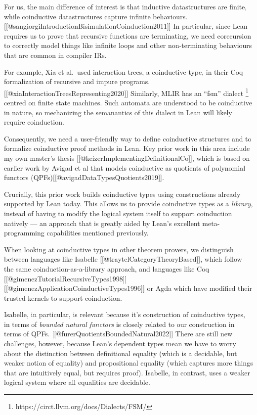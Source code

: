 \documentclass[a4paper]{article}
\begin{document}
For us, the main difference of interest is that inductive datastructures
are finite, while coinductive datastructures capture infinite
behaviours.
{[}{[}@sangiorgiIntroductionBisimulationCoinduction2011{]}{]} In
particular, since Lean requires us to prove that recursive functions are
terminating, we need corecursion to correctly model things like infinite
loops and other non-terminating behaviours that are common in compiler
IRs.

For example, Xia et al.~used interaction trees, a coinductive type, in
their Coq formalization of recursive and impure programs.
{[}{[}@xiaInteractionTreesRepresenting2020{]}{]} Similarly, MLIR has an
``fsm'' dialect \footnote{https://circt.llvm.org/docs/Dialects/FSM/}
centred on finite state machines. Such automata are understood to be
coinductive in nature, so mechanizing the semanantics of this dialect in
Lean will likely require coinduction.

Consequently, we need a user-friendly way to define coinductive
structures and to formalize coinductive proof methods in Lean. Key prior
work in this area include my own master's thesis
{[}{[}@keizerImplementingDefinitionalCo{]}{]}, which is based on earlier
work by Avigad et al that models coinductive as quotients of polynomial
functors (QPFs){[}{[}@avigadDataTypesQuotients2019{]}{]}.

Crucially, this prior work builds coinductive types using constructions
already supported by Lean today. This allows us to provide coinductive
types as a \emph{library}, instead of having to modify the logical
system itself to support coinduction natively --- an approach that is
greatly aided by Lean's excellent meta-programming capabilities
mentioned previously.

When looking at coinductive types in other theorem provers, we
distinguish between languages like Isabelle
{[}{[}@traytelCategoryTheoryBased{]}{]}, which follow the same
coinduction-as-a-library approach, and languages like Coq
{[}{[}@gimenezTutorialRecursiveTypes1998{]}{]}{[}{[}@gimenezApplicationCoinductiveTypes1996{]}{]}
or Agda which have modified their trusted kernels to support
coinduction.

Isabelle, in particular, is relevant because it's construction of
coinductive types, in terms of \emph{bounded natural functors} is
closely related to our construction in terms of QPFs.
{[}{[}@furerQuotientsBoundedNatural2022{]}{]} There are still new
challenges, however, because Lean's dependent types mean we have to
worry about the distinction between definitional equality (which is a
decidable, but weaker notion of equality) and propositional equality
(which captures more things that are intuitively equal, but requires
proof). Isabelle, in contrast, uses a weaker logical system where all
equalities are decidable.
\end{document}
